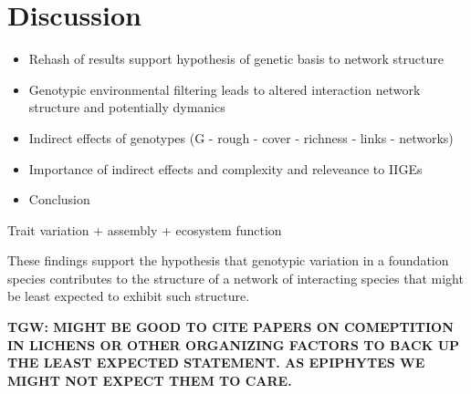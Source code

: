 \documentclass[9pt,twocolumn,twoside,lineno]{pnas-new}
\begin{document}
{





}


\showmatmethods{} %


\section*{Discussion}

\begin{itemize}
\item Rehash of results support hypothesis of genetic basis to network structure
\item Genotypic environmental filtering leads to altered interaction
  network structure and potentially dymanics
\item Indirect effects of genotypes (G - rough - cover - richness -
  links - networks)
\item Importance of indirect effects and complexity and releveance to IIGEs
\item Conclusion
\end{itemize}



Trait variation + assembly + ecosystem function

These findings support the hypothesis that genotypic variation in a
foundation species contributes to the structure of a network of
interacting species that might be least expected to exhibit such
structure. 

\textbf{TGW: MIGHT BE GOOD TO CITE PAPERS ON COMEPTITION IN LICHENS OR
OTHER ORGANIZING FACTORS TO BACK UP THE LEAST EXPECTED STATEMENT.  AS
EPIPHYTES WE MIGHT NOT EXPECT THEM TO CARE.}
\end{document}
